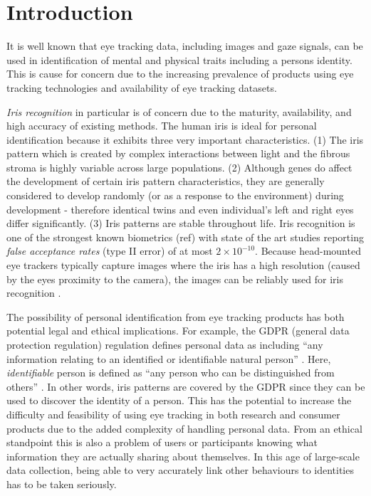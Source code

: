 \section{Introduction}
It is well known that eye tracking data, including images and gaze signals, can be used in identification of mental and physical traits including a persons identity. This is cause for concern due to the increasing prevalence of products using eye tracking technologies and availability of eye tracking datasets.

\emph{Iris recognition} in particular is of concern due to the maturity, availability, and high accuracy of existing methods. The human iris is ideal for personal identification because it exhibits three very important characteristics. (1) The iris pattern which is created by complex interactions between light and the fibrous stroma is highly variable across large populations. (2) Although genes do affect the development of certain iris pattern characteristics, they are generally considered to develop randomly (or as a response to the environment) during development - therefore identical twins and even individual's left and right eyes differ significantly. (3) Iris patterns are stable throughout life. Iris recognition is one of the strongest known biometrics (ref) with state of the art studies reporting \emph{false acceptance rates} (type II error) of at most $2\times 10^{-10}$\cite{DAUGMAN_NEW}. Because head-mounted eye trackers typically capture images where the iris has a high resolution (caused by the eyes proximity to the camera), the images can be reliably used for iris recognition \cite{BRENDAN_BLUR}. 

The possibility of personal identification from eye tracking products has both potential legal and ethical implications. For example, the GDPR (general data protection regulation) regulation defines personal data as including ``any information relating to an identified or identifiable natural person'' \cite{eu-gdpr}. Here, \emph{identifiable} person is defined as ``any person who can be distinguished from others'' \cite{eu-gdpr}. In other words, iris patterns are covered by the GDPR since they can be used to discover the identity of a person. This has the potential to increase the difficulty and feasibility of using eye tracking in both research and consumer products due to the added complexity of handling personal data. From an ethical standpoint this is also a problem of users or participants knowing what information they are actually sharing about themselves. In this age of large-scale data collection, being able to very accurately link other behaviours to identities has to be taken seriously.

